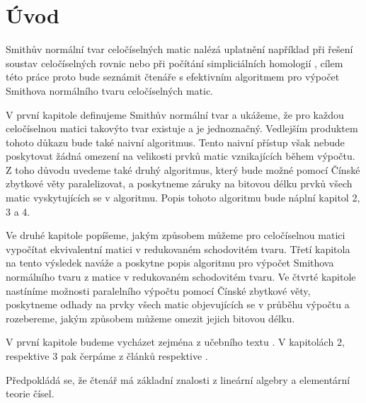 \chapter*{Úvod}

Smithův normální tvar celočíselných matic nalézá uplatnění například při řešení
soustav celočíselných rovnic nebo při počítání simpliciálních homologií \cite{Simplic_Homo},
cílem této práce proto bude seznámit čtenáře s efektivním
algoritmem pro výpočet Smithova normálního tvaru celočíselných matic.

V první kapitole definujeme Smithův normální tvar a ukážeme, že pro každou
celočíselnou matici takovýto tvar existuje a je jednoznačný. Vedlejším produktem
tohoto důkazu bude také naivní algoritmus.
Tento naivní přístup však nebude poskytovat žádná omezení na velikosti prvků
matic vznikajících během výpočtu. Z toho důvodu uvedeme také druhý algoritmus, který
bude možné pomocí Čínské zbytkové věty paralelizovat, a poskytneme záruky na
bitovou délku prvků všech matic vyskytujících se v algoritmu.
Popis tohoto algoritmu bude náplní kapitol 2, 3 a 4.

Ve druhé kapitole popíšeme, jakým způsobem můžeme pro celočíselnou matici
vypočítat ekvivalentní matici v redukovaném schodovitém tvaru. Třetí kapitola
na tento výsledek naváže a poskytne popis algoritmu pro výpočet Smithova
normálního tvaru z matice v redukovaném schodovitém tvaru. Ve čtvrté kapitole
nastíníme možnosti paralelního výpočtu pomocí Čínské zbytkové věty, poskytneme
odhady na prvky všech matic objevujících se v průběhu výpočtu a rozebereme,
jakým způsobem můžeme omezit jejich bitovou délku.

V první kapitole budeme vycházet zejména z učebního textu \cite{vokr}. V 
kapitolách 2, respektive 3 pak čerpáme z článků \cite{triang} respektive 
\cite{SNF_Arne}.

Předpokládá se, že čtenář má základní znalosti z lineární algebry a
elementární teorie čísel.

\cleardoublepage


